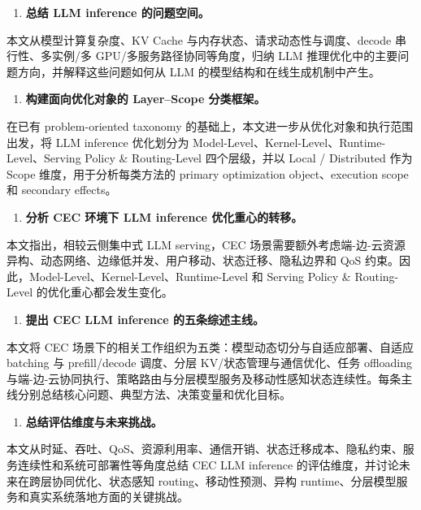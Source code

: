 \documentclass[a4paper,10pt]{ctexart}
\begin{document}
\begin{enumerate}
\item \textbf{总结 LLM inference 的问题空间。}
\end{enumerate}
本文从模型计算复杂度、KV Cache 与内存状态、请求动态性与调度、decode 串行性、多实例/多 GPU/多服务路径协同等角度，归纳 LLM 推理优化中的主要问题方向，并解释这些问题如何从 LLM 的模型结构和在线生成机制中产生。


\begin{enumerate}
\item \textbf{构建面向优化对象的 Layer–Scope 分类框架。}
\end{enumerate}
在已有 problem-oriented taxonomy 的基础上，本文进一步从优化对象和执行范围出发，将 LLM inference 优化划分为 Model-Level、Kernel-Level、Runtime-Level、Serving Policy \& Routing-Level 四个层级，并以 Local / Distributed 作为 Scope 维度，用于分析每类方法的 primary optimization object、execution scope 和 secondary effects。


\begin{enumerate}
\item \textbf{分析 CEC 环境下 LLM inference 优化重心的转移。}
\end{enumerate}
本文指出，相较云侧集中式 LLM serving，CEC 场景需要额外考虑端-边-云资源异构、动态网络、边缘低并发、用户移动、状态迁移、隐私边界和 QoS 约束。因此，Model-Level、Kernel-Level、Runtime-Level 和 Serving Policy \& Routing-Level 的优化重心都会发生变化。


\begin{enumerate}
\item \textbf{提出 CEC LLM inference 的五条综述主线。}
\end{enumerate}
本文将 CEC 场景下的相关工作组织为五类：模型动态切分与自适应部署、自适应 batching 与 prefill/decode 调度、分层 KV/状态管理与通信优化、任务 offloading 与端-边-云协同执行、策略路由与分层模型服务及移动性感知状态连续性。每条主线分别总结核心问题、典型方法、决策变量和优化目标。


\begin{enumerate}
\item \textbf{总结评估维度与未来挑战。}
\end{enumerate}
本文从时延、吞吐、QoS、资源利用率、通信开销、状态迁移成本、隐私约束、服务连续性和系统可部署性等角度总结 CEC LLM inference 的评估维度，并讨论未来在跨层协同优化、状态感知 routing、移动性预测、异构 runtime、分层模型服务和真实系统落地方面的关键挑战。
\end{document}
